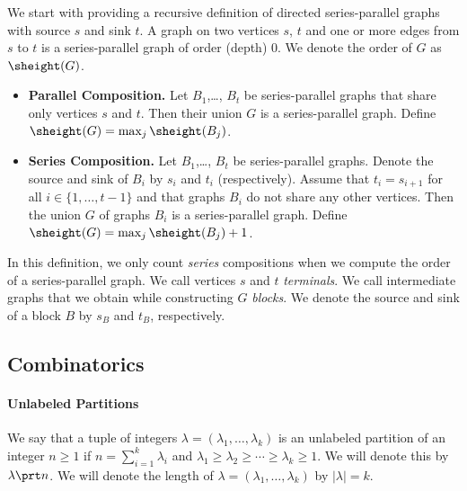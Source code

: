 \documentclass[11pt,a4paper]{article}
\begin{document}
We start with providing a recursive definition of directed series-parallel graphs with source $s$ and sink $t$. 
A graph on two vertices $s$, $t$ and one or more edges from $s$ to $t$ is a series-parallel graph of order (depth) $0$. We denote the order of $G$ as $\sheight(G)$.
\begin{itemize}
\item \textbf{Parallel Composition.} Let $B_1$,\dots, $B_t$ be series-parallel graphs that share only vertices $s$ and $t$. Then their union $G$ is a series-parallel graph. Define $\sheight(G) = \max_j \sheight(B_j)$.
\item \textbf{Series  Composition.}
Let $B_1$,\dots, $B_t$ be series-parallel graphs. Denote the source and sink of $B_i$ by $s_i$ and $t_i$ (respectively). Assume that $t_i = s_{i+1}$ for all $i\in\{1,\dots, t-1\}$ and that graphs $B_i$ do not share any other vertices. Then the union $G$ of graphs $B_i$ is a series-parallel graph. Define $\sheight(G) = \max_j \sheight(B_j) + 1$.
\end{itemize}
In this definition, we only count \textit{series}  compositions when we compute the order of a series-parallel graph. We  call vertices $s$ and $t$ \emph{terminals}. We call intermediate graphs that we obtain while constructing $G$ \emph{blocks}. We denote the source and sink of a block $B$ by $s_B$ and $t_B$, respectively. 


\subsection{Combinatorics}
\label{sec:prelim:comb}
\paragraph{Unlabeled Partitions} We say that a tuple of integers $\lambda= (\lambda_1,\dots,\lambda_k)$ is an unlabeled partition of an integer $n \geq 1$ if $n = \sum_{i=1}^k \lambda_i$ and $\lambda_1\geq \lambda_2 \geq \cdots \ge \lambda_k \geq 1$. We will denote this by $\lambda \prt n$. We will denote the length of $\lambda = (\lambda_1,\dots, \lambda_k)$ by $|\lambda| = k$.
\end{document}
